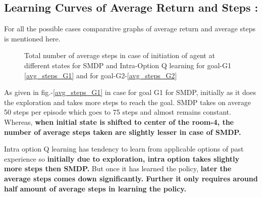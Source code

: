 \documentclass[preprint,12pt]{elsarticle}
\begin{document}
 \subsection{Learning Curves of Average Return and Steps :}
  For all the possible cases comparative graphs of average return and average steps is mentioned here. 
 
 \begin{figure}[H]
 	\centering  
 	\caption{Total number of average steps in case of initiation of agent at different states for SMDP and Intra-Option Q learning for goal-G1 \ref{avg_steps_G1} and for goal-G2-\ref{avg_steps_G2}}
 	\label{fig:Avg_stes}
 \end{figure}
 
 As given in fig.-\ref{avg_steps_G1} in case for goal G1 for SMDP, initially as it does the exploration and takes more steps to reach the goal. SMDP takes on average 50 steps per episode which goes to 75 steps and almost remains constant. Whereas,\textbf{ when initial state is shifted to center of the room-4, the number of average steps taken are slightly lesser in case of SMDP.}
 
 Intra option Q learning has tendency to learn from applicable options of past experience so \textbf{initially due to exploration, intra option takes slightly more steps then SMDP.}  But once it has learned the policy, \textbf{later the average steps comes down significantly.  Further it only requires around half amount of average steps in learning the policy. } 
 
\end{document}
